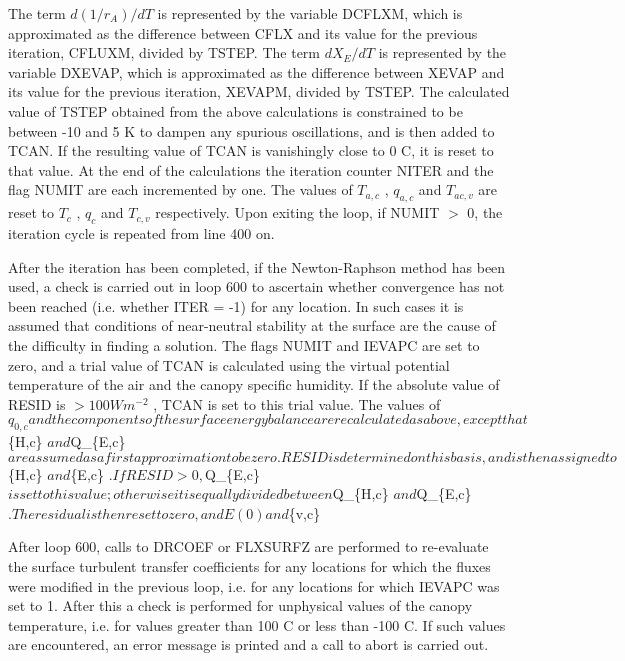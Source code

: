 The term $d(1/r_A )/dT$ is represented by the variable D\+C\+F\+L\+X\+M, which is approximated as the difference between C\+F\+L\+X and its value for the previous iteration, C\+F\+L\+U\+X\+M, divided by T\+S\+T\+E\+P. The term $dX_E /dT$ is represented by the variable D\+X\+E\+V\+A\+P, which is approximated as the difference between X\+E\+V\+A\+P and its value for the previous iteration, X\+E\+V\+A\+P\+M, divided by T\+S\+T\+E\+P. The calculated value of T\+S\+T\+E\+P obtained from the above calculations is constrained to be between -\/10 and 5 K to dampen any spurious oscillations, and is then added to T\+C\+A\+N. If the resulting value of T\+C\+A\+N is vanishingly close to 0 C, it is reset to that value. At the end of the calculations the iteration counter N\+I\+T\+E\+R and the flag N\+U\+M\+I\+T are each incremented by one. The values of $T_{a,c}$ , $q_{a,c}$ and $T_{ac,v}$ are reset to $T_c$ , $q_c$ and $T_{c,v}$ respectively. Upon exiting the loop, if N\+U\+M\+I\+T $>$ 0, the iteration cycle is repeated from line 400 on.

After the iteration has been completed, if the Newton-\/\+Raphson method has been used, a check is carried out in loop 600 to ascertain whether convergence has not been reached (i.\+e. whether I\+T\+E\+R = -\/1) for any location. In such cases it is assumed that conditions of near-\/neutral stability at the surface are the cause of the difficulty in finding a solution. The flags N\+U\+M\+I\+T and I\+E\+V\+A\+P\+C are set to zero, and a trial value of T\+C\+A\+N is calculated using the virtual potential temperature of the air and the canopy specific humidity. If the absolute value of R\+E\+S\+I\+D is $> 100 W m^{-2}$ , T\+C\+A\+N is set to this trial value. The values of $q_{0,c} and the components of the surface energy balance are recalculated as above, except that $\{H,c\} $ and $Q\+\_\+\{E,c\} $ are assumed as a first approximation to be zero. RESID is determined on this basis, and is then assigned to $\{H,c\} $ and $\{E,c\} $ . If RESID > 0, $Q\+\_\+\{E,c\} $ is set to this value; otherwise it is equally divided between $Q\+\_\+\{H,c\} $ and $Q\+\_\+\{E,c\} $ . The residual is then reset to zero, and E(0) and $\{v,c\}

After loop 600, calls to D\+R\+C\+O\+E\+F or F\+L\+X\+S\+U\+R\+F\+Z are performed to re-\/evaluate the surface turbulent transfer coefficients for any locations for which the fluxes were modified in the previous loop, i.\+e. for any locations for which I\+E\+V\+A\+P\+C was set to 1. After this a check is performed for unphysical values of the canopy temperature, i.\+e. for values greater than 100 C or less than -\/100 C. If such values are encountered, an error message is printed and a call to abort is carried out.

